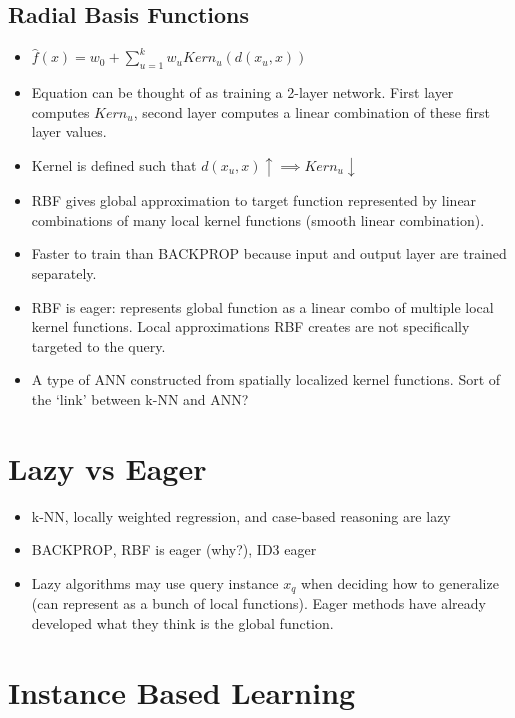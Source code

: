 \documentclass[titlepage,11pt]{article}
\begin{document}
\subsection{Radial Basis Functions}
\begin{itemize}
\item $\hat{f}(x) = w_0+ \sum_{u=1}^k{w_uKern_u(d(x_u, x))}$
\item Equation can be thought of as training a 2-layer network. First layer computes $Kern_u$, second layer computes a linear combination of these first layer values.
\item Kernel is defined such that $d(x_u, x) \uparrow \implies Kern_u \downarrow$
\item RBF gives global approximation to target function represented by linear combinations of many local kernel functions (smooth linear combination).
\item Faster to train than \textsc{BACKPROP} because input and output layer are trained separately.
\item RBF is eager: represents global function as a linear combo of multiple local kernel functions. Local approximations RBF creates are not specifically targeted to the query.
\item A type of ANN constructed from spatially localized kernel functions. Sort of the `link' between k-NN and ANN?
\end{itemize}


\section{Lazy vs Eager}
\begin{itemize}
\item k-NN, locally weighted regression, and case-based reasoning are lazy
\item \textsc{BACKPROP}, RBF is eager (why?), ID3 eager
\item Lazy algorithms may use query instance $x_q$ when deciding how to generalize (can represent as a bunch of local functions). Eager methods have already developed what they think is the global function.
\end{itemize}
\section{Instance Based Learning}
\end{document}
